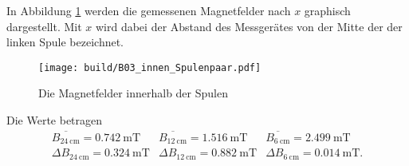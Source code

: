 In Abbildung \ref{fig:B03_innen} werden die gemessenen Magnetfelder nach $x$ graphisch dargestellt.
Mit $x$ wird dabei der Abstand des Messgerätes von der Mitte der der linken Spule bezeichnet.
\begin{figure}
    \centering
    \caption{Die Magnetfelder innerhalb der Spulen}
    \label{fig:B03_innen}
    \texttt{[image: build/B03\_innen\_Spulenpaar.pdf]}
\end{figure}

Die Werte betragen
\begin{align}
    \overline{B_{\qty{24}{\centi\meter}}}= \qty[]{0.742}{\milli\tesla}     &
    \overline{B_{\qty{12}{\centi\meter}}}= \qty[]{1.516}{\milli\tesla}    &
    \overline{B_{\qty{6 }{\centi\meter}}}= \qty[]{2.499}{\milli\tesla}     \\
    \Delta B_{\qty{24}{\centi\meter}}= \qty[]{0.324}{\milli\tesla}     &
    \Delta B_{\qty{12}{\centi\meter}}= \qty[]{0.882}{\milli\tesla}     &
    \Delta B_{\qty{6 }{\centi\meter}}= \qty[]{0.014}{\milli\tesla}.     
\end{align}
